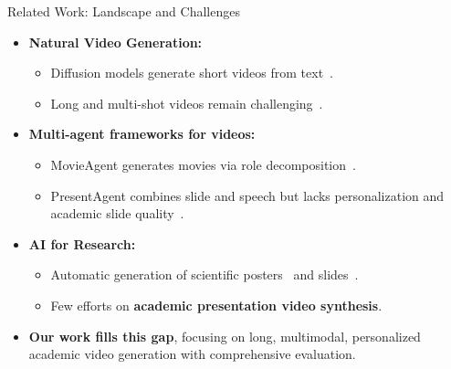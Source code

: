 \documentclass{beamer}
\newcommand{\alertterm}[1]{\alert{\textbf{#1}}}
\begin{document}
\begin{frame}{Related Work: Landscape and Challenges}
\begin{itemize}
  \item \textbf{Natural Video Generation:}
  \begin{itemize}
    \item Diffusion models generate short videos from text~\cite{sd_video,wan}.
    \item Long and multi-shot videos remain challenging~\cite{deepmind2025veo3}.
  \end{itemize}
  \item \textbf{Multi-agent frameworks for videos:}
  \begin{itemize}
    \item MovieAgent generates movies via role decomposition~\cite{wu2025automated}.
    \item PresentAgent combines slide and speech but lacks personalization and academic slide quality~\cite{shi2025presentagent}.
  \end{itemize}
  \item \textbf{AI for Research:}
  \begin{itemize}
    \item Automatic generation of scientific posters~\cite{pang2025paper2poster} and slides~\cite{zheng2025pptagent}.
    \item Few efforts on \alertterm{academic presentation video synthesis}.
  \end{itemize}
  \item \alertterm{Our work fills this gap}, focusing on long, multimodal, personalized academic video generation with comprehensive evaluation.
\end{itemize}
\end{frame}
\end{document}
